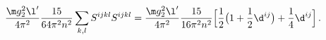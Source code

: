 \begin{equation}
\frac{\m g_2^2\l'}{4\pi^2}\frac{15}{64\pi^2n^2}\sum_{k,l}S^{ijkl}S^{ijkl}=
\frac{\m g_2^2\l'}{4\pi^2}\frac{15}{16\pi^2n^2}\Bigl[\frac{1}{2}\bigl(1+\frac{1}{2}\d^{ij}\bigr)+\frac{1}{4}\d^{ij}\Bigr]\,.
\end{equation}

